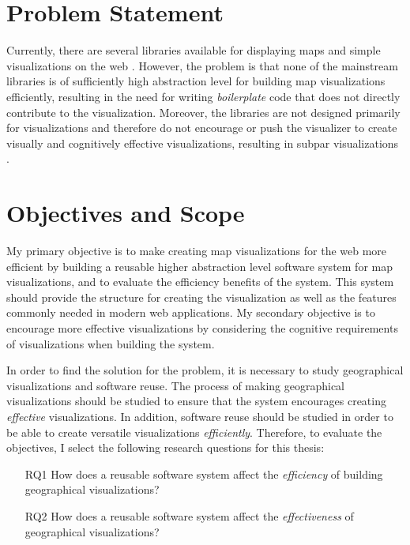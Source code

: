 \section{Problem Statement}

Currently, there are several libraries available for displaying maps and simple visualizations on the web \citep{google_maps_2005,agafonkin_leaflet_2011,metacarta_openlayers_2006}. However, the problem is that none of the mainstream libraries is of sufficiently high abstraction level for building map visualizations efficiently, resulting in the need for writing \emph{boilerplate} code that does not directly contribute to the visualization. Moreover, the libraries are not designed primarily for visualizations and therefore do not encourage or push the visualizer to create visually and cognitively effective visualizations, resulting in subpar visualizations \citep[chap.~1]{slocum_thematic_2014}.

\section{Objectives and Scope}

My primary objective is to make creating map visualizations for the web more efficient by building a reusable higher abstraction level software system for map visualizations, and to evaluate the efficiency benefits of the system. This system should provide the structure for creating the visualization as well as the features commonly needed in modern web applications. My secondary objective is to encourage more effective visualizations by considering the cognitive requirements of visualizations when building the system.

In order to find the solution for the problem, it is necessary to study geographical visualizations and software reuse. The process of making geographical visualizations should be studied to ensure that the system encourages creating \emph{effective} visualizations. In addition, software reuse should be studied in order to be able to create versatile visualizations \emph{efficiently}. Therefore, to evaluate the objectives, I select the following research questions for this thesis:

\begin{enumerate}
	\item[RQ1] How does a reusable software system affect the \emph{efficiency} of building geographical visualizations?
	\item[RQ2] How does a reusable software system affect the \emph{effectiveness} of geographical visualizations?
\end{enumerate}

